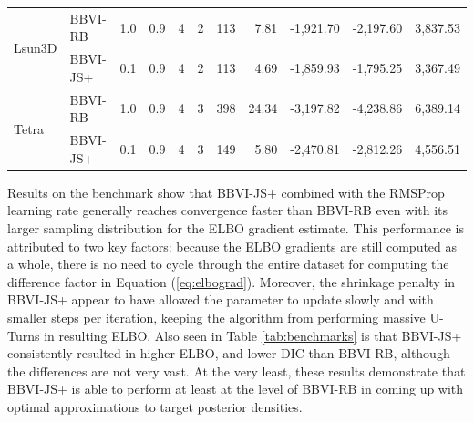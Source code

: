\documentclass{article}
\begin{document}
\begin{table}[ht]
{\begin{tabular}{llrrrrrrrrr}
\multirow{2}{*}{Lsun3D}             & BBVI-RB                          & 1.0                                               & 0.9                                                & 4                                               & 2                                               & 113                               & 7.81                              & -1,921.70                         & -2,197.60                           & 3,837.53                         \\
                                    & BBVI-JS+                           & 0.1                                               & 0.9                                                & 4                                               & 2                                               & 113                               & 4.69                              & -1,859.93                         & -1,795.25                           & 3,367.49                         \\ \hline
\multirow{2}{*}{Tetra}              & BBVI-RB                          & 1.0                                               & 0.9                                                & 4                                               & 3                                               & 398                               & 24.34                             & -3,197.82                         & -4,238.86                           & 6,389.14                         \\
                                    & BBVI-JS+                           & 0.1                                               & 0.9                                                & 4                                               & 3                                               & 149                               & 5.80                              & -2,470.81                         & -2,812.26                           & 4,556.51                          \\ \hline
\end{tabular}}
\end{table}

Results on the benchmark show that BBVI-JS+ combined with the RMSProp learning rate generally reaches convergence faster than BBVI-RB even with its larger sampling distribution for the ELBO gradient estimate. This performance is attributed to two key factors: because the ELBO gradients are still computed as a whole, there is no need to cycle through the entire dataset for computing the difference factor in Equation (\ref{eq:elbograd}). Moreover, the shrinkage penalty in BBVI-JS+ appear to have allowed the parameter to update slowly and with smaller steps per iteration, keeping the algorithm from performing massive U-Turns in resulting ELBO. Also seen in Table \ref{tab:benchmarks} is that BBVI-JS+ consistently resulted in higher ELBO, and lower DIC than BBVI-RB, although the differences are not very vast. At the very least, these results demonstrate that BBVI-JS+ is able to perform at least at the level of BBVI-RB in coming up with optimal approximations to target posterior densities.
\end{document}
